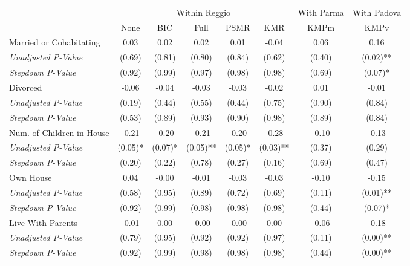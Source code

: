 \begin{tabular}{l c c c c c c c}
\toprule
& \multicolumn{5}{c}{Within Reggio} & With Parma & With Padova \\\cmidrule(lr){2-6} \cmidrule(lr){7-7} \cmidrule(lr){8-8}
 & None & BIC & Full & PSMR & KMR & KMPm & KMPv \\
\midrule
Married or Cohabitating & 0.03 & 0.02 & 0.02 & 0.01 & -0.04 & 0.06 & 0.16 \\
\quad \textit{Unadjusted P-Value} & (0.69) & (0.81) & (0.80) & (0.84) & (0.62) & (0.40) & (0.02)** \\
\quad \textit{Stepdown P-Value} & (0.92) & (0.99) & (0.97) & (0.98) & (0.98) & (0.69) & (0.07)* \\
Divorced & -0.06 & -0.04 & -0.03 & -0.03 & -0.02 & 0.01 & -0.01 \\
\quad \textit{Unadjusted P-Value} & (0.19) & (0.44) & (0.55) & (0.44) & (0.75) & (0.90) & (0.84) \\
\quad \textit{Stepdown P-Value} & (0.53) & (0.89) & (0.93) & (0.90) & (0.98) & (0.89) & (0.84) \\
Num. of Children in House & -0.21 & -0.20 & -0.21 & -0.20 & -0.28 & -0.10 & -0.13 \\
\quad \textit{Unadjusted P-Value} & (0.05)* & (0.07)* & (0.05)** & (0.05)* & (0.03)** & (0.37) & (0.29) \\
\quad \textit{Stepdown P-Value} & (0.20) & (0.22) & (0.78) & (0.27) & (0.16) & (0.69) & (0.47) \\
Own House & 0.04 & -0.00 & -0.01 & -0.03 & -0.03 & -0.10 & -0.15 \\
\quad \textit{Unadjusted P-Value} & (0.58) & (0.95) & (0.89) & (0.72) & (0.69) & (0.11) & (0.01)** \\
\quad \textit{Stepdown P-Value} & (0.92) & (0.99) & (0.98) & (0.98) & (0.98) & (0.44) & (0.07)* \\
Live With Parents & -0.01 & 0.00 & -0.00 & -0.00 & 0.00 & -0.06 & -0.18 \\
\quad \textit{Unadjusted P-Value} & (0.79) & (0.95) & (0.92) & (0.92) & (0.97) & (0.11) & (0.00)** \\
\quad \textit{Stepdown P-Value} & (0.92) & (0.99) & (0.98) & (0.98) & (0.98) & (0.44) & (0.00)** \\
\bottomrule
\end{tabular}
